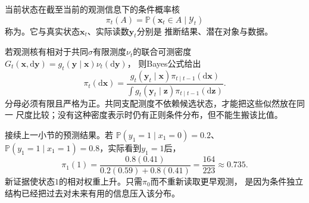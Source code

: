 \begin{definition}[滤波分布]
 \label{def:dynamical-filtering-distribution}
 当前状态在截至当前的观测信息下的条件概率核
 \begin{equation}
  \pi_t(A)=\mathbb P(\bm x_t\in A\mid\mathcal Y_t)
   \label{eq:dynamical-filtering-distribution}
 \end{equation}
 称为。它与真实状态$\bm x_t$、实际读数$\bm y_t$分别是
 推断结果、潜在对象与数据。
\end{definition}

若观测核有相对于共同$\sigma$有限测度$\nu_t$的联合可测密度
$G_t(\bm x,\mathrm d\bm y)=g_t(\bm y\mid\bm x)\nu_t(\mathrm d\bm y)$，
则Bayes公式给出
\begin{equation}
 \pi_t(\mathrm d\bm x)=
 \frac{g_t(\bm y_t\mid\bm x)\pi_{t\mid t-1}(\mathrm d\bm x)}
      {\int g_t(\bm y_t\mid\bm z)\pi_{t\mid t-1}(\mathrm d\bm z)}.
 \label{eq:dynamical-general-bayes-filter}
\end{equation}
分母必须有限且严格为正。共同支配测度不依赖候选状态，才能把这些似然放在同一
尺度比较；没有这种密度表示时仍有正则条件分布，但不能生搬该比值。

\begin{example}[两状态模型的一次预测与校正]
 \label{ex:dynamical-two-state-bayes-filter}
 接续上一小节的预测结果。若
 $\mathbb P(y_1=1\mid x_1=0)=0.2$、
 $\mathbb P(y_1=1\mid x_1=1)=0.8$，实际看到$y_1=1$后，
 \[
  \pi_1(1)=\frac{0.8(0.41)}{0.2(0.59)+0.8(0.41)}
              =\frac{164}{223}\approx0.735.
 \]
 新证据使状态$1$的相对权重上升。只需$\pi_0$而不重新读取更早观测，
 是因为条件独立结构已经把过去对未来有用的信息压入该分布。
\end{example}

